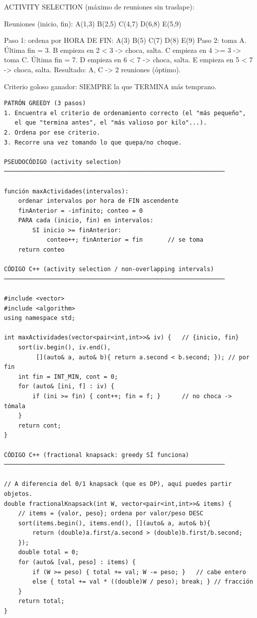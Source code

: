 \begin{dsadiagrama}
ACTIVITY SELECTION (máximo de reuniones sin traslape):

Reuniones (inicio, fin):
  A(1,3)  B(2,5)  C(4,7)  D(6,8)  E(5,9)

Paso 1: ordena por HORA DE FIN:  A(3) B(5) C(7) D(8) E(9)
Paso 2: toma A. Última fin = 3.
        B empieza en 2 < 3 -> choca, salta.
        C empieza en 4 >= 3 -> toma C. Última fin = 7.
        D empieza en 6 < 7 -> choca, salta.
        E empieza en 5 < 7 -> choca, salta.
Resultado: {A, C} -> 2 reuniones (óptimo).

Criterio goloso ganador: SIEMPRE la que TERMINA más temprano.
\end{dsadiagrama}

\begin{lstlisting}
PATRÓN GREEDY (3 pasos)
1. Encuentra el criterio de ordenamiento correcto (el "más pequeño",
   el que "termina antes", el "más valioso por kilo"...).
2. Ordena por ese criterio.
3. Recorre una vez tomando lo que quepa/no choque.

PSEUDOCÓDIGO (activity selection)
──────────────────────────────────────────────────────────────

función maxActividades(intervalos):
    ordenar intervalos por hora de FIN ascendente
    finAnterior = -infinito; conteo = 0
    PARA cada (inicio, fin) en intervalos:
        SI inicio >= finAnterior:
            conteo++; finAnterior = fin       // se toma
    return conteo

CÓDIGO C++ (activity selection / non-overlapping intervals)
──────────────────────────────────────────────────────────────

#include <vector>
#include <algorithm>
using namespace std;

int maxActividades(vector<pair<int,int>>& iv) {   // {inicio, fin}
    sort(iv.begin(), iv.end(),
         [](auto& a, auto& b){ return a.second < b.second; }); // por fin
    int fin = INT_MIN, cont = 0;
    for (auto& [ini, f] : iv) {
        if (ini >= fin) { cont++; fin = f; }      // no choca -> tómala
    }
    return cont;
}

CÓDIGO C++ (fractional knapsack: greedy SÍ funciona)
──────────────────────────────────────────────────────────────

// A diferencia del 0/1 knapsack (que es DP), aquí puedes partir objetos.
double fractionalKnapsack(int W, vector<pair<int,int>>& items) {
    // items = {valor, peso}; ordena por valor/peso DESC
    sort(items.begin(), items.end(), [](auto& a, auto& b){
        return (double)a.first/a.second > (double)b.first/b.second;
    });
    double total = 0;
    for (auto& [val, peso] : items) {
        if (W >= peso) { total += val; W -= peso; }   // cabe entero
        else { total += val * ((double)W / peso); break; } // fracción
    }
    return total;
}


\end{lstlisting}
